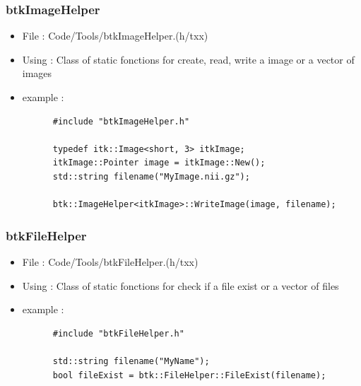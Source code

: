     \subsubsection{btkImageHelper}
    \begin{itemize}
    \item File : Code/Tools/btkImageHelper.(h/txx)
    \item Using : Class of static fonctions for create, read, write a image or a vector of images
    \item example :
      \begin{verbatim}
      #include "btkImageHelper.h"
                 
      typedef itk::Image<short, 3> itkImage;
      itkImage::Pointer image = itkImage::New();
      std::string filename("MyImage.nii.gz");

      btk::ImageHelper<itkImage>::WriteImage(image, filename);

      \end{verbatim}
    \end{itemize}

    \subsubsection{btkFileHelper}
    \begin{itemize}
    \item File : Code/Tools/btkFileHelper.(h/txx)
    \item Using : Class of static fonctions for check if a file exist or a vector of files
    \item example :
      \begin{verbatim}
      #include "btkFileHelper.h"

      std::string filename("MyName");
      bool fileExist = btk::FileHelper::FileExist(filename);
      \end{verbatim}

    \end{itemize}

